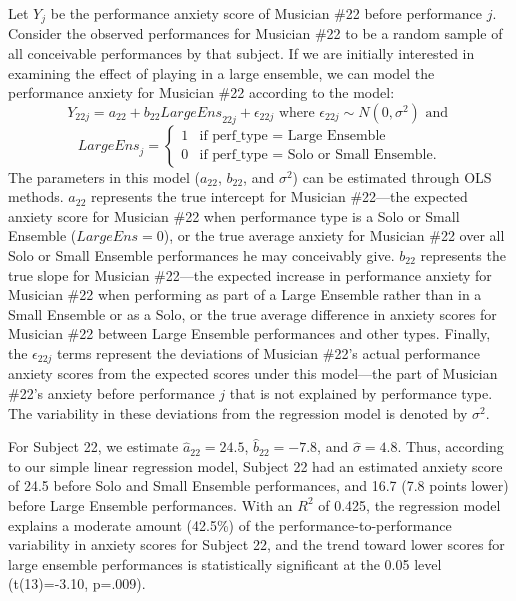 \documentclass[
]{krantz}
\begin{document}
Let \(Y_{j}\) be the performance anxiety score of Musician \#22 before performance \(j\). Consider the observed performances for Musician \#22 to be a random sample of all conceivable performances by that subject. If we are initially interested in examining the effect of playing in a large ensemble, we can model the performance anxiety for Musician \#22 according to the model:
\begin{equation}
Y_{22j}=a_{22}+b_{22}\textstyle{LargeEns}_{22j}+\epsilon_{22j} \textrm{ where } \epsilon_{22j}\sim N(0,\sigma^2) \textrm{ and }
\label{eq:level1a}
\end{equation}
\[ \textstyle{LargeEns}_{j} = \left\{ \begin{array}{ll}
                                1 & \textrm{if perf_type = Large Ensemble}\\
                                0 & \textrm{if perf_type = Solo or Small Ensemble.}
                                        \end{array}
                                \right.  \]
The parameters in this model (\(a_{22}\), \(b_{22}\), and \(\sigma^2\)) can be estimated through OLS methods. \(a_{22}\) represents the true intercept for Musician \#22---the expected anxiety score for Musician \#22 when performance type is a Solo or Small Ensemble (\(\textstyle{LargeEns}=0\)), or the true average anxiety for Musician \#22 over all Solo or Small Ensemble performances he may conceivably give. \(b_{22}\) represents the true slope for Musician \#22---the expected increase in performance anxiety for Musician \#22 when performing as part of a Large Ensemble rather than in a Small Ensemble or as a Solo, or the true average difference in anxiety scores for Musician \#22 between Large Ensemble performances and other types. Finally, the \(\epsilon_{22j}\) terms represent the deviations of Musician \#22's actual performance anxiety scores from the expected scores under this model---the part of Musician \#22's anxiety before performance \(j\) that is not explained by performance type. The variability in these deviations from the regression model is denoted by \(\sigma^2\).

For Subject 22, we estimate \(\hat{a}_{22}=24.5\), \(\hat{b}_{22}=-7.8\), and \(\hat{\sigma}=4.8\). Thus, according to our simple linear regression model, Subject 22 had an estimated anxiety score of 24.5 before Solo and Small Ensemble performances, and 16.7 (7.8 points lower) before Large Ensemble performances. With an \(R^2\) of 0.425, the regression model explains a moderate amount (42.5\%) of the performance-to-performance variability in anxiety scores for Subject 22, and the trend toward lower scores for large ensemble performances is statistically significant at the 0.05 level (t(13)=-3.10, p=.009).
\end{document}
